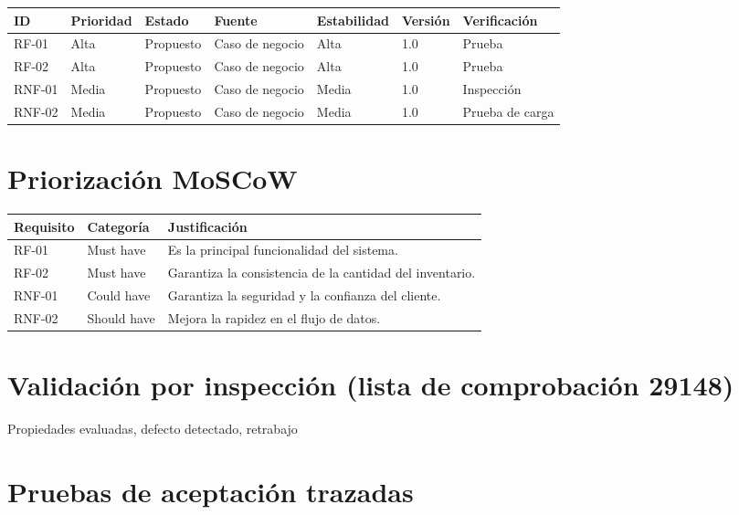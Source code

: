 \documentclass[11pt]{article}
\begin{document}
\begin{center}
\small
\begin{tabular}{@{}lllllll@{}}
\toprule
\textbf{ID} & \textbf{Prioridad} & \textbf{Estado} & \textbf{Fuente} & \textbf{Estabilidad} & \textbf{Versión} & \textbf{Verificación} \\
\midrule
RF-01  & Alta  & Propuesto  & Caso de negocio & Alta  & 1.0 & Prueba \\
RF-02  & Alta  & Propuesto  & Caso de negocio & Alta  & 1.0 & Prueba \\
RNF-01 & Media & Propuesto  & Caso de negocio & Media & 1.0 & Inspección \\
RNF-02 & Media & Propuesto  & Caso de negocio & Media & 1.0 & Prueba de carga \\
\bottomrule
\end{tabular}
\end{center}

\section{Priorización MoSCoW}

\begin{center}
\begin{tabular}{@{}llp{8.5cm}@{}}
\toprule
\textbf{Requisito} & \textbf{Categoría} & \textbf{Justificación} \\
\midrule
RF-01  & Must have   & Es la principal funcionalidad del sistema. \\
RF-02  & Must have   & Garantiza la consistencia de la cantidad del inventario. \\
RNF-01 & Could have  & Garantiza la seguridad y la confianza del cliente. \\
RNF-02 & Should have & Mejora la rapidez en el flujo de datos. \\
\bottomrule
\end{tabular}
\end{center}

\section{Validación por inspección (lista de comprobación 29148)}

Propiedades evaluadas, defecto detectado, retrabajo
\section{Pruebas de aceptación trazadas}
\end{document}
